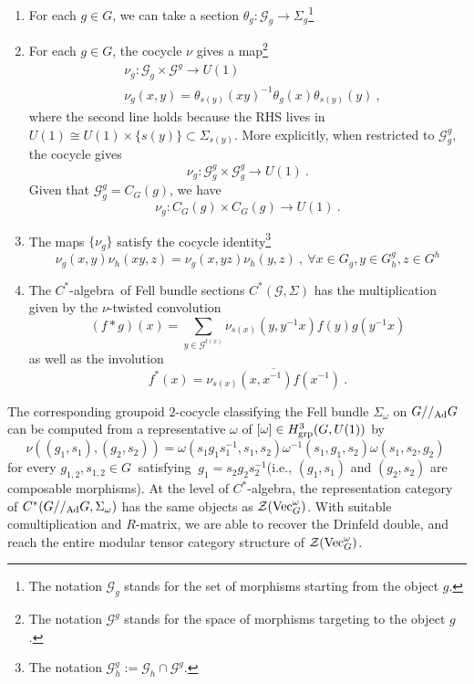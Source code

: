 \documentclass[a4paper,11pt]{article}
\newcommand{\be}{\begin{equation}}
\newcommand{\ee}{\end{equation}}
\newcommand{\ba}{\begin{aligned}}
\newcommand{\ea}{\end{aligned}}
\def\CG{\mathcal{G}}
\def\CZ{\mathcal{Z}}
\def\calg{$C^*$-algebra\ }
\def\vecgo{{\rm Vec}_G^\omega}
\def\gmg{G//_{\rm Ad} G}
\begin{document}
\begin{enumerate}
    \item For each $g\in G$, we can take a section $\theta_g : \CG_g\to \Sigma_g$\footnote{The notation $\CG_g$ stands for the set of morphisms starting from the object $g$.}
    \item For each $g\in G$, the cocycle $\nu$ gives a map\footnote{The notation $\CG^g$ stands for the space of morphisms targeting to the object $g$.} 
    \be\ba
    &\nu_g: \CG_g\times \CG^g \to U(1) \\ 
    &\nu_g(x,y) = \theta_{s(y)}(xy)^{-1} \theta_g(x) \theta_{s(y)}(y) \ ,
    \ea\ee
    where the second line holds because the RHS lives in $U(1) \cong U(1) \times \{s(y) \}\subset \Sigma_{ s(y)}$. More explicitly, when restricted to $\CG_g^g$, the cocycle gives
    \be  \nu_g : \CG_g^g\times \CG_g^g \to U(1) \ . \ee
    Given that $\CG_g^g = C_G(g)$, we have
    \be  \nu_g : C_G(g)\times C_G(g) \to U(1)  \ . \ee
    \item The maps $\{\nu_g\}$ satisfy the cocycle identity\footnote{The notation $\CG^g_h := \CG_h\cap \CG^g$.}
    \be\label{eq:cocycle}
    \nu_g\left(x, y\right) \nu_h\left(x y, z\right)=\nu_g\left(x, y z\right) \nu_h\left(y, z\right) \ , \ \forall x \in G_g, y \in G_h^g, z \in G^h
    \ee
    \item The \calg of Fell bundle sections $C^*(\CG,\Sigma)$ has the multiplication given by the $\nu$-twisted convolution
    \be
    (f*g)(x) = \sum_{y\in \CG^{t(x)}} \nu_{s(x)}(y,y^{-1}x) f(y) g(y^{-1}x) 
    \ee
    as well as the involution
    \be
    f^*(x) = \overline{\nu_{s(x)}(x,x^{-1}) f(x^{-1})} \ .
    \ee
\end{enumerate}
The corresponding groupoid $2$-cocycle classifying the Fell bundle $\Sigma_\omega$ on $\gmg$ can be computed from a representative $\omega$ of $[\omega]\in H^3_{\rm grp}(G,U(1))$ by~\cite{Bhowmick:2018}
\be
\nu\left((g_1,s_1), (g_2,s_2)\right)=\omega\left(s_1 g_1 s_1^{-1}, s_1, s_2\right) \omega^{-1}\left(s_1, g_1, s_2\right) \omega\left(s_1, s_2, g_2\right) \ 
\ee
for every $g_{1,2},s_{1,2} \in G \ $ satisfying $ \ g_1 = s_2g_2s_2^{-1}$(i.e., $(g_1,s_1) $ and $ (g_2,s_2)$ are composable morphisms). At the level of $C^*$-algebra, the representation category of $C^*(\gmg,\Sigma_\omega)$ has the same objects as $\CZ(\vecgo)$. With suitable comultiplication and $R$-matrix, we are able to recover the Drinfeld double, and reach the entire modular tensor category structure of $\CZ(\vecgo)$.
\end{document}
